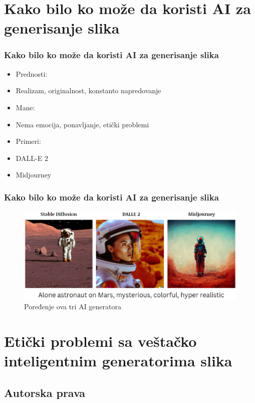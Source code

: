 \documentclass{beamer}
\begin{document}
\section{Kako bilo ko može da koristi AI za generisanje slika}	%

\begin{frame}[fragile]\frametitle{Kako bilo ko može da koristi AI za generisanje slika}
    \begin{itemize}
		\item Prednosti:
        \item[] Realizam, originalnost, konstanto napredovanje
        \item Mane:
        \item[] Nema emocija, ponavljanje, etički problemi
        \item Primeri:
		\item[] DALL-E 2
		\item[] Midjourney
	\end{itemize}
	
\end{frame}

\begin{frame}[fragile]\frametitle{Kako bilo ko može da koristi AI za generisanje slika}
	
\begin{figure}[htp]
\centering
\includegraphics[width=1\textwidth]{astronaut.eps}
\caption{Poređenje ova tri AI generatora}
\label{fig: Astronaut}
\end{figure}
	
\end{frame}


\section{Etički problemi sa veštačko inteligentnim generatorima slika} %
\subsection{Autorska prava}
\end{document}
